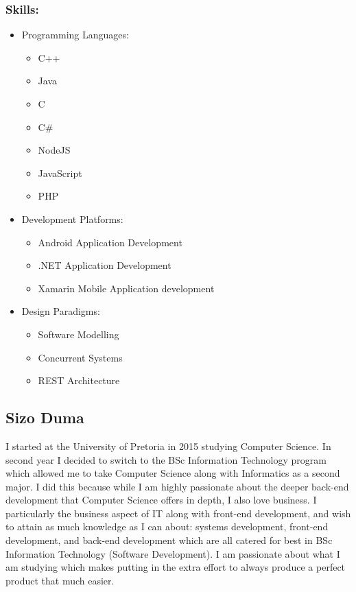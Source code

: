 \documentclass[12pt]{article}
\begin{document}
	\subsubsection{Skills:}
	\begin{itemize}
	\item Programming Languages:
	\begin{itemize}
	\item C++
	\item Java
	\item C
	\item C\#
	\item NodeJS
	\item JavaScript
	\item PHP
	\end{itemize}
	\item Development Platforms:
	\begin{itemize}
	\item Android Application Development
	\item .NET Application Development
	\item Xamarin Mobile Application development
	\end{itemize}
	\item Design Paradigms:
	\begin{itemize}
	\item Software Modelling
	\item Concurrent Systems
	\item REST Architecture
	\end{itemize}
	\end{itemize}
	
	\subsection{Sizo Duma}
	I started at the University of Pretoria in 2015 studying Computer Science. In second year I decided to switch to the BSc Information Technology program which allowed me to take Computer Science along with Informatics as a second major. I did this because while I am highly passionate about the deeper back-end development that Computer Science offers in depth, I also love business. I particularly the business aspect of IT along with front-end development, and wish to attain as much knowledge as I can about: systems development, front-end development, and back-end development which are all catered for best in BSc Information Technology (Software Development). I am passionate about what I am studying which makes putting in the extra effort to always produce a perfect product that much easier.	
	
\end{document}
